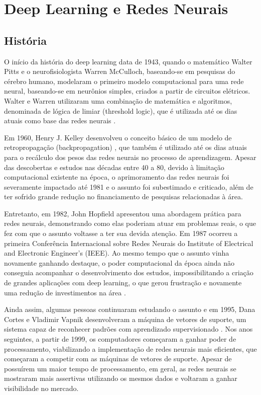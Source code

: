 \section{Deep Learning e Redes Neurais}

\subsection{História}
\indent
\par O início da história do deep learning data de 1943, quando o matemático Walter Pitts e o neurofisiologista Warren McCulloch, baseando-se em pesquisas do cérebro humano, modelaram o primeiro modelo computacional para uma rede neural, baseando-se em neurônios simples, criados a partir de circuitos elétricos. Walter e Warren utilizaram uma combinação de matemática e algoritmos, denominada de lógica de limiar (threshold logic), que é utilizada até os dias atuais como base das redes neurais \cite{Academy2019}.

\par Em 1960, Henry J. Kelley desenvolveu o conceito básico de um modelo de retropropagação (backpropagation) \cite{Foote2019}, que também é utilizado até os dias atuais para o recálculo dos pesos das redes neurais no processo de aprendizagem. Apesar das descobertas e estudos nas décadas entre 40 a 80, devido à limitação computacional existente na época, o aprimoramento das redes neurais foi severamente impactado até 1981 e o assunto foi subestimado e criticado, além de ter sofrido grande redução no financiamento de pesquisas relacionadas à área.

\par Entretanto, em 1982, John Hopfield apresentou uma abordagem prática para redes neurais, demonstrando como elas poderiam atuar em problemas reais, o que fez com que o assunto voltasse a ter sua devida atenção. Em 1987 ocorreu a primeira Conferência Internacional sobre Redes Neurais do Institute of Electrical and Electronic Engineer’s (IEEE). Ao mesmo tempo que o assunto vinha novamente ganhando destaque, o poder computacional da época ainda não conseguia acompanhar o desenvolvimento dos estudos, impossibilitando a criação de grandes aplicações com deep learning, o que gerou frustração e novamente uma redução de investimentos na área \cite{Academy2019}.

\par Ainda assim, algumas pessoas continuaram estudando o assunto e em 1995, Dana Cortes e Vladimir Vapnik desenvolveram a máquina de vetores de suporte, um sistema capaz de reconhecer padrões com aprendizado supervisionado \cite{Foote2019}. Nos anos seguintes, a partir de 1999, os computadores começaram a ganhar poder de processamento, viabilizando a implementação de redes neurais mais eficientes, que começaram a competir com as máquinas de vetores de suporte. Apesar de possuírem um maior tempo de processamento, em geral, as redes neurais se mostraram mais assertivas utilizando os mesmos dados e voltaram a ganhar visibilidade no mercado.

